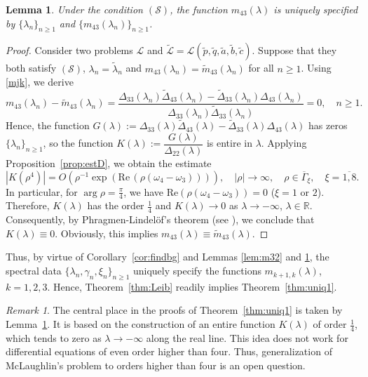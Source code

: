 \documentclass[a4paper,12pt]{article}
\newcommand{\ga}{\gamma}
\newcommand{\la}{\lambda}
\newcommand{\om}{\omega}
\theoremstyle{plain}
\numberwithin{equation}{section}
\newtheorem{lem}[thm]{Lemma}
\theoremstyle{definition}
\theoremstyle{remark}
\newtheorem{remark}[thm]{Remark}
\begin{document}
\begin{lem} \label{lem:m43}
Under the condition $(\mathcal S)$, the function $m_{43}(\la)$ is uniquely specified by $\{ \la_n \}_{n \ge 1}$ and $\{ m_{43}(\la_n) \}_{n \ge 1}$.
\end{lem}

\begin{proof}
Consider two problems $\mathcal L$ and $\tilde {\mathcal L} = \mathcal L(\tilde p, \tilde q, \tilde a, \tilde b, \tilde c)$. Suppose that they both satisfy $(\mathcal S)$, $\la_n = \tilde \la_n$ and $m_{43}(\la_n) = \tilde m_{43}(\la_n)$ for all $n \ge 1$. Using \eqref{mjk}, we derive
$$
m_{43}(\la_n) - \tilde m_{43}(\la_n) = \frac{\Delta_{33}(\la_n) \tilde \Delta_{43}(\la_n) - \tilde \Delta_{33}(\la_n) \Delta_{43}(\la_n)}{\Delta_{33}(\la_n) \tilde \Delta_{33}(\la_n)} = 0, \quad n \ge 1.
$$
Hence, the function $G(\la) := \Delta_{33}(\la) \tilde \Delta_{43}(\la) - \tilde \Delta_{33}(\la) \Delta_{43}(\la)$ has zeros $\{ \la_n \}_{n \ge 1}$, so the function $K(\la) := \dfrac{G(\la)}{\Delta_{22}(\la)}$ is entire in $\la$. Applying Proposition~\ref{prop:estD}, we obtain the estimate
$$
|K(\rho^4)| = O\left( \rho^{-1} \exp(\mbox{Re} \, (\rho(\om_4 - \om_3)))\right), \quad |\rho| \to \infty, \quad \rho \in \overline{\Gamma}_{\xi}, \quad \xi = \overline{1,8}.
$$
In particular, for $\arg \rho = \frac{\pi}{4}$, we have $\mbox{Re}(\rho(\om_4 - \om_3)) = 0$ ($\xi = 1$ or $2$). Therefore, $K(\la)$ has the order $\frac{1}{4}$ and $K(\la) \to 0$ as $\la \to -\infty$, $\la \in \mathbb R$. Consequently, by Phragmen-Lindel\"of's theorem (see \cite[Corollary~5.1]{BFY14}), we conclude that $K(\la) \equiv 0$. Obviously, this implies $m_{43}(\la) \equiv \tilde m_{43}(\la)$.
\end{proof}

Thus, by virtue of Corollary~\ref{cor:findbg} and Lemmas \ref{lem:m32} and \ref{lem:m43}, the spectral data $\{ \la_n, \ga_n, \xi_n \}_{n \ge 1}$ uniquely specify the functions $m_{k+1,k}(\la)$, $k = 1, 2, 3$. Hence, Theorem~\ref{thm:Leib} readily implies Theorem~\ref{thm:uniq1}.

\begin{remark}
The central place in the proofs of Theorem~\ref{thm:uniq1} is taken by Lemma~\ref{lem:m43}. It is based on the construction of an entire function $K(\la)$ of order $\frac{1}{4}$, which tends to zero as $\la \to -\infty$ along the real line. This idea does not work for differential equations of even order higher than four. Thus, generalization of McLaughlin's problem to orders higher than four is an open question.
\end{remark}
\end{document}
